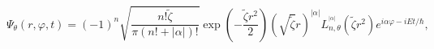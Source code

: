 \begin{equation}
\Psi_{\theta}\left(  r,\varphi,t\right)  =\left(  -1\right)  ^{n}\sqrt
{\frac{n!\tilde{\zeta}}{\pi\left(  n!+\left|  \alpha\right|  \right)  !}}%
\exp\left(  -\frac{\tilde{\zeta}r^{2}}{2}\right)  \left(  \sqrt{\tilde{\zeta}%
}r\right)  ^{\left|  \alpha\right|  }L_{n,\theta}^{^{\left|  \alpha\right|  }%
}\left(  \tilde{\zeta}r^{2}\right)  e^{i\alpha\varphi-iEt/\hbar},\label{36.5}%
\end{equation}

